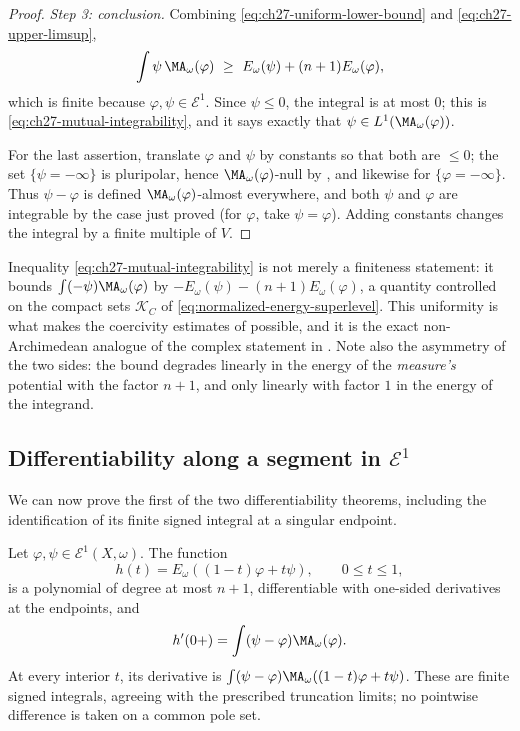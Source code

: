 \begin{proof}
\emph{Step 3: conclusion.}
Combining \eqref{eq:ch27-uniform-lower-bound} and
\eqref{eq:ch27-upper-limsup},
\[
 \int\psi\,\MA_\omega(\varphi)\ \geq\ E_\omega(\psi)+(n+1)E_\omega(\varphi),
\]
which is finite because $\varphi,\psi\in\mathcal E^1$.  Since
$\psi\leq0$, the integral is at most $0$; this is
\eqref{eq:ch27-mutual-integrability}, and it says exactly that
$\psi\in L^1(\MA_\omega(\varphi))$.

For the last assertion, translate $\varphi$ and $\psi$ by constants so
that both are $\leq0$; the set $\{\psi=-\infty\}$ is pluripolar, hence
$\MA_\omega(\varphi)$-null by , and likewise
for $\{\varphi=-\infty\}$.  Thus $\psi-\varphi$ is defined
$\MA_\omega(\varphi)$-almost everywhere, and both $\psi$ and
$\varphi$ are integrable by the case just proved (for $\varphi$, take
$\psi=\varphi$).  Adding constants changes the integral by a finite
multiple of $V$.
\end{proof}

\begin{remark}
\label{rem:ch27-mutual-quantitative}
Inequality \eqref{eq:ch27-mutual-integrability} is not merely a finiteness
statement: it bounds $\int(-\psi)\MA_\omega(\varphi)$ by
$-E_\omega(\psi)-(n+1)E_\omega(\varphi)$, a quantity controlled on the
compact sets $\mathcal K_C$ of \eqref{eq:normalized-energy-superlevel}.
This uniformity is what makes the coercivity estimates of
 possible, and it is the exact
non-Archimedean analogue of the complex statement in
\cite[\S2]{BBGZ13}.  Note also the asymmetry of the two sides: the bound
degrades linearly in the energy of the \emph{measure's} potential with the
factor $n+1$, and only linearly with factor $1$ in the energy of the
integrand.
\end{remark}

\subsection{Differentiability along a segment in
\texorpdfstring{$\mathcal E^1$}{E1}}
\label{sec:ch27-e1-segment}

We can now prove the first of the two differentiability theorems, including
the identification of its finite signed integral at a singular endpoint.

\begin{theorem}\label{thm:e1-energy-differentiability}
Let $\varphi,\psi\in\mathcal E^1(X,\omega)$. The function
\[
              h(t)=E_\omega((1-t)\varphi+t\psi),
              \qquad 0\leq t\leq1,
\]
is a polynomial of degree at most $n+1$, differentiable with one-sided
derivatives at the endpoints, and
\begin{equation}\label{eq:e1-energy-derivative}
 h'(0+)=\int(\psi-\varphi)\MA_\omega(\varphi).
\end{equation}
At every interior $t$, its derivative is
$\int(\psi-\varphi)\MA_\omega((1-t)\varphi+t\psi)$.
These are finite signed integrals, agreeing with the prescribed truncation
limits; no pointwise difference is taken on a common pole set.
\end{theorem}

